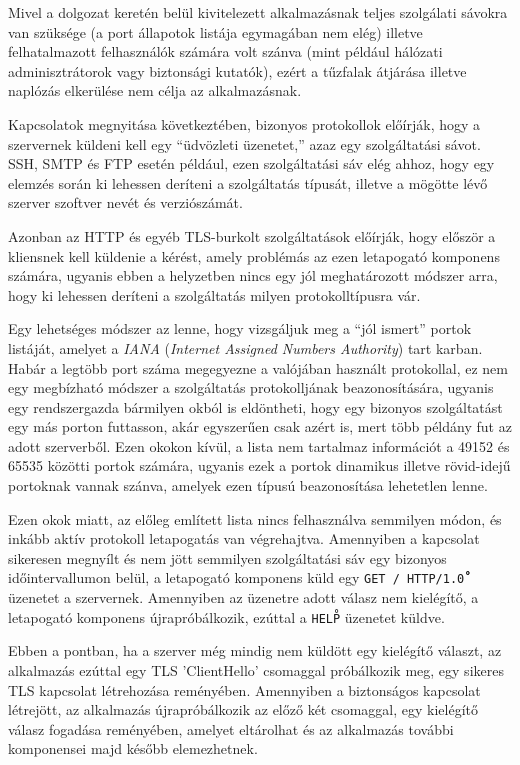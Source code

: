 \documentclass[a4paper,12pt]{article}
\newcounter{subsubsubsection}[subsubsection]
\begin{document}
	Mivel a dolgozat keretén belül kivitelezett alkalmazásnak teljes szolgálati sávokra van szüksége (a port állapotok listája egymagában nem elég) illetve felhatalmazott felhasználók számára volt szánva (mint például hálózati adminisztrátorok vagy biztonsági kutatók), ezért a tűzfalak átjárása illetve naplózás elkerülése nem célja az alkalmazásnak.


	Kapcsolatok megnyitása következtében, bizonyos protokollok előírják, hogy a szervernek küldeni kell egy ``üdvözleti üzenetet,'' azaz egy szolgáltatási sávot. SSH, SMTP és FTP esetén például, ezen szolgáltatási sáv elég ahhoz, hogy egy elemzés során ki lehessen deríteni a szolgáltatás típusát, illetve a mögötte lévő szerver szoftver nevét és verziószámát.
	
	Azonban az HTTP és egyéb TLS-burkolt szolgáltatások előírják, hogy először a kliensnek kell küldenie a kérést, amely problémás az ezen letapogató komponens számára, ugyanis ebben a helyzetben nincs egy jól meghatározott módszer arra, hogy ki lehessen deríteni a szolgáltatás milyen protokolltípusra vár.
	
	Egy lehetséges módszer az lenne, hogy vizsgáljuk meg a ``jól ismert'' portok\cite{iana16} listáját, amelyet a \textit{IANA} (\textit{Internet Assigned Numbers Authority}) tart karban. Habár a legtöbb port száma megegyezne a valójában használt protokollal, ez nem egy megbízható módszer a szolgáltatás protokolljának beazonosítására, ugyanis egy rendszergazda bármilyen okból is eldöntheti, hogy egy bizonyos szolgáltatást egy más porton futtasson, akár egyszerűen csak azért is, mert több példány fut az adott szerverből. Ezen okokon kívül, a lista nem tartalmaz információt a 49152 és 65535 közötti portok számára, ugyanis ezek a portok dinamikus illetve rövid-idejű portoknak vannak szánva, amelyek ezen típusú beazonosítása lehetetlen lenne.
	
	Ezen okok miatt, az előleg említett lista nincs felhasználva semmilyen módon, és inkább aktív protokoll letapogatás van végrehajtva. Amennyiben a kapcsolat sikeresen megnyílt és nem jött semmilyen szolgáltatási sáv egy bizonyos időintervallumon belül, a letapogató komponens küld egy \texttt{GET / HTTP/1.0}\texttt{\r\n\r\n} üzenetet a szervernek. Amennyiben az üzenetre adott válasz nem kielégítő, a letapogató komponens újrapróbálkozik, ezúttal a \texttt{HELP\r\n} üzenetet küldve.
	
	Ebben a pontban, ha a szerver még mindig nem küldött egy kielégítő választ, az alkalmazás ezúttal egy TLS 'ClientHello' csomaggal próbálkozik meg, egy sikeres TLS kapcsolat létrehozása reményében. Amennyiben a biztonságos kapcsolat létrejött, az alkalmazás újrapróbálkozik az előző két csomaggal, egy kielégítő válasz fogadása reményében, amelyet eltárolhat és az alkalmazás további komponensei majd később elemezhetnek.
\end{document}
